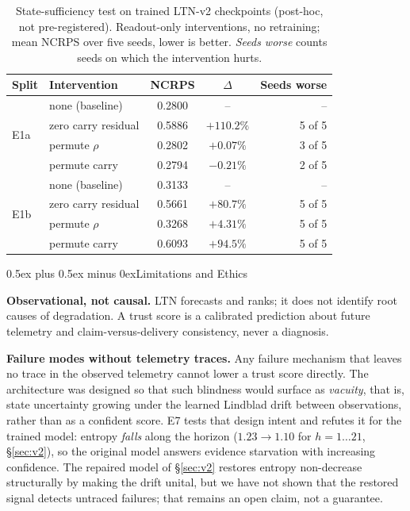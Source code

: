 \documentclass[journal]{IEEEtran}
\makeatletter
\def\section{\@startsection{section}{1}{\z@}{1.8ex plus 1ex minus 0.75ex}%
{0.5ex plus 0.5ex minus 0ex}{\normalfont\normalsize\centering\scshape}}
\makeatother
\begin{document}
\begin{table}[t]\centering
\caption{State-sufficiency test on trained LTN-v2 checkpoints (post-hoc,
not pre-registered). Readout-only interventions, no retraining; mean NCRPS over five
seeds, lower is better. \emph{Seeds worse} counts seeds on which the intervention hurts.}
\label{tab:carry}
\footnotesize
\setlength{\tabcolsep}{4pt}
\begin{tabular}{llccr}
\toprule
Split & Intervention & NCRPS & $\Delta$ & Seeds worse \\
\midrule
\multirow{4}{*}{E1a}
 & none (baseline)        & 0.2800 & -- & -- \\
 & zero carry residual    & 0.5886 & $+110.2\%$ & 5 of 5 \\
 & permute $\rho$         & 0.2802 & $+0.07\%$ & 3 of 5 \\
 & permute carry          & 0.2794 & $-0.21\%$ & 2 of 5 \\
\midrule
\multirow{4}{*}{E1b}
 & none (baseline)        & 0.3133 & -- & -- \\
 & zero carry residual    & 0.5661 & $+80.7\%$ & 5 of 5 \\
 & permute $\rho$         & 0.3268 & $+4.31\%$ & 5 of 5 \\
 & permute carry          & 0.6093 & $+94.5\%$ & 5 of 5 \\
\bottomrule
\end{tabular}
\end{table}

\section{Limitations and Ethics}\label{sec:limitations}

\textbf{Observational, not causal.} LTN forecasts and ranks; it does not identify root
causes of degradation. A trust score is a calibrated prediction about future telemetry
and claim-versus-delivery consistency, never a diagnosis.

\textbf{Failure modes without telemetry traces.} Any failure mechanism that leaves no
trace in the observed telemetry cannot lower a trust score directly. The architecture
was designed so that such blindness would surface as \emph{vacuity}, that is, state
uncertainty growing under the learned Lindblad drift between observations, rather
than as a confident score. E7 tests that design intent and refutes it for the trained
model: entropy \emph{falls} along the horizon ($1.23 \to 1.10$ for $h = 1\ldots21$,
\S\ref{sec:v2}), so the original model answers evidence starvation with increasing
confidence. The repaired model of \S\ref{sec:v2} restores entropy non-decrease
structurally by making the drift unital, but we have not shown that the restored
signal detects untraced failures; that remains an open claim, not a guarantee.
\end{document}
